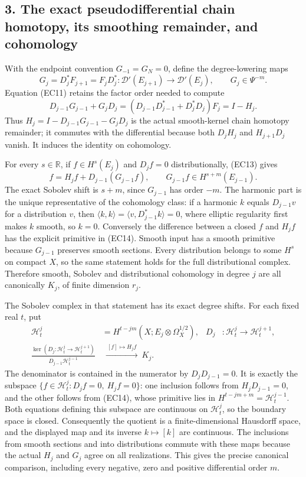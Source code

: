 \documentclass[
  11pt,
]{article}
\begin{document}
\subsection{3. The exact pseudodifferential chain homotopy, its
smoothing remainder, and
cohomology}\label{the-exact-pseudodifferential-chain-homotopy-its-smoothing-remainder-and-cohomology}

With the endpoint convention \(G_{-1}=G_N=0\), define the
degree-lowering maps \[
 G_j=D_j^*F_{j+1}=F_jD_j^*:
    \mathcal D'(E_{j+1})\longrightarrow\mathcal D'(E_j),
 \qquad G_j\in\Psi^{-m}.
 \tag{EC12}
\] Equation (EC11) retains the factor order needed to compute \[
 D_{j-1}G_{j-1}+G_jD_j
  =(D_{j-1}D_{j-1}^*+D_j^*D_j)F_j
  =I-H_j.
 \tag{EC13}
\] Thus \(H_j=I-D_{j-1}G_{j-1}-G_jD_j\) is the actual smooth-kernel
chain homotopy remainder; it commutes with the differential because both
\(D_jH_j\) and \(H_{j+1}D_j\) vanish. It induces the identity on
cohomology.

For every \(s\in\mathbb R\), if \(f\in H^s(E_j)\) and \(D_jf=0\)
distributionally, (EC13) gives \[
 f=H_jf+D_{j-1}(G_{j-1}f),\qquad
 G_{j-1}f\in H^{s+m}(E_{j-1}).
 \tag{EC14}
\] The exact Sobolev shift is \(s+m\), since \(G_{j-1}\) has order
\(-m\). The harmonic part is the unique representative of the cohomology
class: if a harmonic \(k\) equals \(D_{j-1}v\) for a distribution \(v\),
then \(\langle k,k\rangle=\langle v,D_{j-1}^*k\rangle=0\), where
elliptic regularity first makes \(k\) smooth, so \(k=0\). Conversely the
difference between a closed \(f\) and \(H_jf\) has the explicit
primitive in (EC14). Smooth input has a smooth primitive because
\(G_{j-1}\) preserves smooth sections. Every distribution belongs to
some \(H^s\) on compact \(X\), so the same statement holds for the full
distributional complex. Therefore smooth, Sobolev and distributional
cohomology in degree \(j\) are all canonically \(K_j\), of finite
dimension \(r_j\).

The Sobolev complex in that statement has its exact degree shifts. For
each fixed real \(t\), put \[
 \begin{aligned}
 \mathcal H^j_t&=H^{t-jm}(X;E_j\otimes\Omega_X^{1/2}),&
 D_j&:\mathcal H^j_t\longrightarrow\mathcal H^{j+1}_t,\\
 \frac{\ker(D_j:\mathcal H^j_t\to\mathcal H^{j+1}_t)}
      {D_{j-1}\mathcal H^{j-1}_t}
 &\ \xrightarrow{\ [f]\mapsto H_jf\ }\ K_j.&
 \end{aligned}
 \tag{EC14a}
\] The denominator is contained in the numerator by \(D_jD_{j-1}=0\). It
is exactly the subspace \(\{f\in\mathcal H^j_t:D_jf=0,\ H_jf=0\}\): one
inclusion follows from \(H_jD_{j-1}=0\), and the other follows from
(EC14), whose primitive lies in \(H^{t-jm+m}=\mathcal H^{j-1}_t\). Both
equations defining this subspace are continuous on \(\mathcal H^j_t\),
so the boundary space is closed. Consequently the quotient is a
finite-dimensional Hausdorff space, and the displayed map and its
inverse \(k\mapsto[k]\) are continuous. The inclusions from smooth
sections and into distributions commute with these maps because the
actual \(H_j\) and \(G_j\) agree on all realizations. This gives the
precise canonical comparison, including every negative, zero and
positive differential order \(m\).
\end{document}

